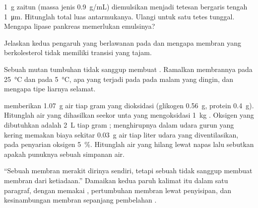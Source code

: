 \begin{exercise}[$\star\star$]\label{exo:b1:lipids:8}
\qty{1}{g}  zaitun (massa jenis \qty{0.9}{g/mL}) diemulsikan
menjadi tetesan bergaris tengah \qty{1}{\micro m}. Hitunglah total luas
antarmukanya. Ulangi untuk satu tetes tunggal. Mengapa lipase pankreas
memerlukan emulsinya?
\end{exercise}

\begin{exercise}[$\star\star$]\label{exo:b1:lipids:9}
Jelaskan kedua pengaruh  yang berlawanan pada 
dan mengapa membran yang berkolesterol tidak memiliki transisi yang
tajam.
\end{exercise}

\begin{exercise}[$\star\star\star$]\label{exo:b1:lipids:10}
Sebuah mutan tumbuhan tidak sanggup membuat .
Ramalkan membrannya pada \qty{25}{\celsius} dan pada \qty{5}{\celsius},
apa yang terjadi pada  pada malam yang dingin, dan mengapa tipe
liarnya selamat.
\end{exercise}

\begin{exercise}[$\star\star\star$]\label{exo:b1:lipids:11}
 memberikan \qty{1.07}{g} air tiap gram yang dioksidasi (glikogen
\qty{0.56}{g}, protein \qty{0.4}{g}). Hitunglah air yang dihasilkan
seekor unta yang mengoksidasi \qty{1}{kg} . Oksigen yang
dibutuhkan adalah \qty{2}{L} tiap gram ; menghirupnya dalam udara
gurun yang kering memakan biaya sekitar \qty{0.03}{g} air tiap liter
udara yang diventilasikan, pada penyarian oksigen \qty{5}{\%}.
Hitunglah air yang hilang lewat napas lalu sebutkan apakah punuknya
sebuah simpanan air.
\end{exercise}

\begin{exercise}[$\star\star\star$]\label{exo:b1:lipids:12}
``Sebuah membran merakit dirinya sendiri, tetapi sebuah  tidak
sanggup membuat membran dari ketiadaan.'' Damaikan kedua paruh kalimat
itu dalam satu paragraf, dengan memakai , pertumbuhan
membran lewat penyisipan, dan kesinambungan membran sepanjang pembelahan
.
\end{exercise}

